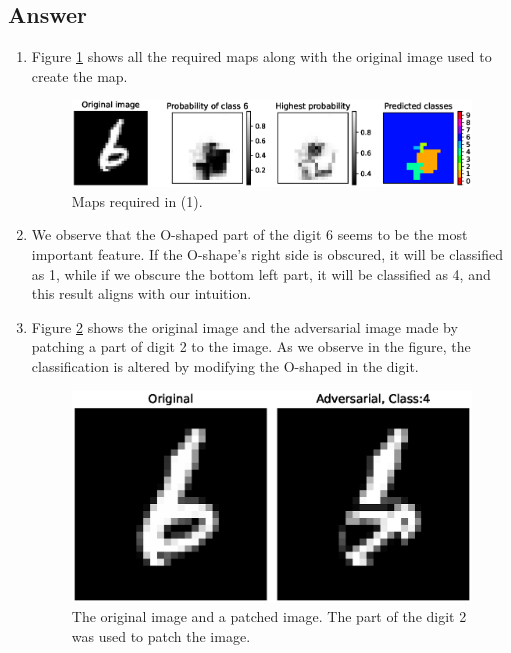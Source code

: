 \documentclass[
	12pt, %
]{../Template/fphw}
\begin{document}
\subsection*{Answer} 
\begin{enumerate}[label=(\arabic*)]
    \item Figure \ref{fig:Q3_1} shows all the required maps along with the original image used to create the map.
    \begin{figure}[!htbp]
        \centering
        \includegraphics[width=\textwidth]{codes/P3_1}
        \caption{Maps required in (1). }
        \label{fig:Q3_1}
    \end{figure}
    \item We observe that the O-shaped part of the digit 6 seems to be the most important feature. If the O-shape's right side is obscured, it will be classified as 1, while if we obscure the bottom left part, it will be classified as 4, and this result aligns with our intuition.
    \item Figure \ref{fig:hw3adversarial} shows the original image and the adversarial image made by patching a part of digit 2 to the image. As we observe in the figure, the classification is altered by modifying the O-shaped in the digit.
    \begin{figure}[!htbp]
        \centering
        \includegraphics{codes/adversarial_image}
        \caption{The original image and a patched image. The part of the digit 2 was used to patch the image.}
        \label{fig:hw3adversarial}
    \end{figure}
\end{enumerate}
\end{document}
